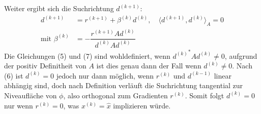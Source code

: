 \documentclass{article}
\begin{document}
Weiter ergibt sich die Suchrichtung $d^{(k+1)}$:
\begin{align*}
    d^{(k+1)}&=r^{(k+1)} + \beta^{(k)}d^{(k)},\quad \langle d^{(k+1)}, d^{(k)}\rangle_A = 0\tag{6}\\
    \text{mit } \beta^{(k)} &= -\dfrac{r^{(k+1)}Ad^{(k)}}{d^{(k)}Ad^{(k)}} \tag{7}
\end{align*}
Die Gleichungen (5) und (7) sind wohldefiniert, wenn ${d^{(k)}}^*Ad^{(k)}\neq 0$, aufgrund der positiv Definitheit 
von $A$ ist dies genau dann der Fall wenn $d^{(k)}\neq 0$. 
Nach (6) ist $d^{(k)} = 0$ jedoch nur dann möglich, wenn $r^{(k)}$ und $d^{(k-1)}$ linear abhängig sind, 
doch nach Definition verläuft die Suchrichtung tangential zur Niveaufläche von $\phi$, 
also orthogonal zum Gradienten $r^{(k)}$.
Somit folgt $d^{(k)} = 0$ nur wenn $r^{(k)}=0$, was $x^{(k)}=\hat{x}$ implizieren würde. \\ \\
\end{document}

